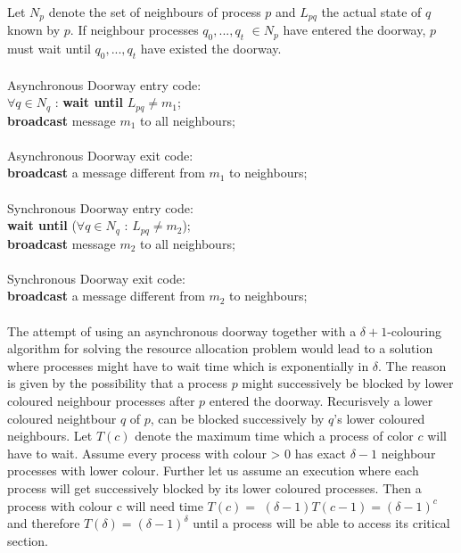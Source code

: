 \documentclass[a4paper]{article}
\newcommand{\solution}[2][]{
  \ifthenelse{\equal{#1}{} \or \equal{#1}{a}}{\\[3pt]\textit{Solution: }\\[0.1cm]}{}
  \parbox[t]{\textwidth}{
    \ifthenelse{\equal{#1}{}}{}{#1)}
    \parbox[t]{0.95\textwidth}{#2}}\\
}
\begin{document}
\solution{
  Let $N_p$ denote the set of neighbours of process $p$ and $L_{pq}$ the
  actual state of $q$ known by $p$. If neighbour processes $q_0,...,q_t$
  $\in N_p$ have entered the doorway, $p$ must wait until $q_0,...,q_t$ 
  have existed the doorway. \\ \\
  Asynchronous Doorway entry code:\\
  $\forall q \in N_q$ : \textbf{wait until} $L_{pq} \neq m_1$;\\
  \textbf{broadcast} message $m_1$ to all neighbours;\\ \\
  Asynchronous Doorway exit code: \\
  \textbf{broadcast} a message different from $m_1$ to neighbours;\\ \\
  Synchronous Doorway entry code:\\
  \textbf{wait until} ($\forall q \in N_q$ : $L_{pq} \neq m_2$);\\
  \textbf{broadcast} message $m_2$ to all neighbours;\\ \\
  Synchronous Doorway exit code:\\
  \textbf{broadcast} a message different from $m_2$ to neighbours;\\ \\
  The attempt of using an asynchronous doorway together with a $\delta +1$-colouring
  algorithm for solving the resource allocation problem would lead to a solution where
  processes might have to wait time which is exponentially in $\delta$. The reason 
  is given by the possibility that a process $p$ might successively be blocked by 
  lower coloured neighbour processes after $p$ entered the doorway. Recurisvely a lower
  coloured neightbour $q$ of $p$, can be blocked successively by $q$'s lower coloured
  neighbours. Let $T(c)$ denote the maximum time which a process of color $c$ will have
  to wait. Assume every process with colour > 0 has exact $\delta - 1$ neighbour processes
  with lower colour. Further let us assume an execution where each process will get successively
  blocked by its lower coloured processes. Then a process with colour c will need time $T(c) =$
  $(\delta-1)T(c-1)=(\delta-1)^c$ and therefore $T(\delta)=(\delta-1)^\delta$ until a process
  will be able to access its critical section.
}
%
\end{document}
